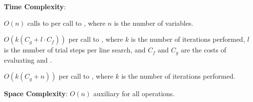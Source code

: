 \textbf{Time Complexity}:
\begin{compactitem}
  \item $O(n)$ calls to  per call to , where $n$ is the number of variables.
  \item $O(k(C_g + l \cdot C_f))$ per call to , where $k$ is the number of iterations performed, $l$ is the number of trial steps per line search, and $C_f$ and $C_g$ are the costs of evaluating  and .
  \item $O(k(C_g + n))$ per call to , where $k$ is the number of iterations performed.
\end{compactitem}

\textbf{Space Complexity}: $O(n)$ auxiliary for all operations.

